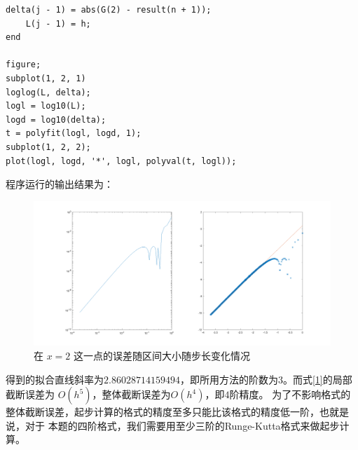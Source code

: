 \documentclass[12pt,a4paper,UTF8]{ctexart}
\theoremstyle{nonumberplain}
\begin{document}
\begin{enumerate}
\begin{enumerate}
\begin{lstlisting}[frame=single]
    delta(j - 1) = abs(G(2) - result(n + 1));
    L(j - 1) = h;
end

figure;
subplot(1, 2, 1)
loglog(L, delta);
logl = log10(L);
logd = log10(delta);
t = polyfit(logl, logd, 1);
subplot(1, 2, 2);
plot(logl, logd, '*', logl, polyval(t, logl));                     
\end{lstlisting}
                    \par 程序运行的输出结果为：
                    \begin{figure}[H]
                        \centering
                        \includegraphics[scale=0.3]{3_4.png}
                        \caption{在 $x=2$ 这一点的误差随区间大小随步长变化情况}
                    \end{figure}
                    得到的拟合直线斜率为$2.86028714159494$，即所用方法的阶数为$3$。而式\ref{1}的局部截断误差为
                    $O\left(h^{5}\right)$，整体截断误差为$O\left(h^{4}\right)$，即$4$阶精度。
                    为了不影响格式的整体截断误差，起步计算的格式的精度至多只能比该格式的精度低一阶，也就是说，对于
                    本题的四阶格式，我们需要用至少三阶的Runge-Kutta格式来做起步计算。
          \end{enumerate}
\end{enumerate}
\end{document}
